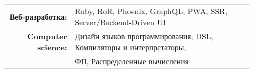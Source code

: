 
\vspace{1em}
\begin{tabular}{rl}

    \textbf{Веб-разработка:} & Ruby, RoR, Phoenix, GraphQL, PWA, SSR, Server/Backend-Driven UI \\
    \textbf{Computer science:} & Дизайн языков программирования, DSL, Компиляторы и интерпретаторы,\\
                               & ФП, Распределенные вычисления \\

\end{tabular}
